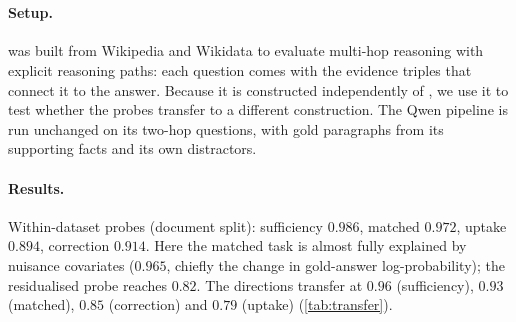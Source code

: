 \section{\twowiki{}}
\label{app:twowiki}
\paragraph{Setup.} \twowiki{} \cite{ho2020constructing} was built from Wikipedia and Wikidata to evaluate multi-hop reasoning with explicit reasoning paths: each question comes with the evidence triples that connect it to the answer. Because it is constructed independently of \musique{}, we use it to test whether the probes transfer to a different construction. The Qwen pipeline is run unchanged on its two-hop questions, with gold paragraphs from its supporting facts and its own distractors.

\paragraph{Results.} Within-dataset probes (document split): sufficiency $0.986$, matched $0.972$, uptake $0.894$, correction $0.914$. Here the matched task is almost fully explained by nuisance covariates ($0.965$, chiefly the change in gold-answer log-probability); the residualised probe reaches $0.82$. The \musique{} directions transfer at $0.96$ (sufficiency), $0.93$ (matched), $0.85$ (correction) and $0.79$ (uptake) (\cref{tab:transfer}).
